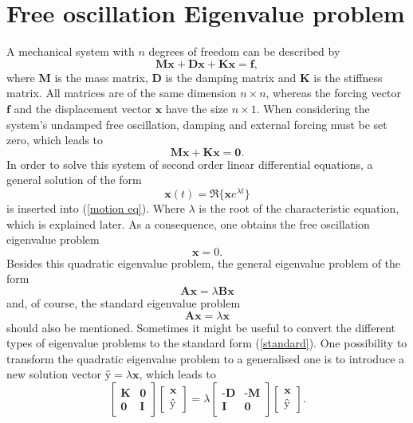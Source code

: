 \documentclass[conference]{journal}
\begin{document}
	\section{Free oscillation Eigenvalue problem}
	A mechanical system with $n$ degrees of freedom can be described by 
	\begin{equation}\label{motion eq}
	\textbf{M\"x}+\textbf{D\.{x}}+\textbf{Kx}=\textbf{f},
	\end{equation}
	where $\mathrm{\textbf{M}}$ is the mass matrix, $\mathrm{\textbf{D}}$ is the damping matrix and $\mathrm{\textbf{K}}$ is the stiffness matrix. All matrices are of the same dimension $n \times n$, whereas the forcing vector $\textbf{f}$ and the displacement vector $\textbf{x}$ have the size $n \times 1$. When considering the system's undamped free oscillation, damping and external forcing must be set zero, which leads to
	\begin{equation}
	\textbf{M\"x}+\textbf{Kx}=\textbf{0}.
	\end{equation}
	In order to solve this system of second order linear differential equations, a general solution of the form
	\begin{equation}
	\textbf{x}(t)=\Re\{\textbf{\^x}e^{\lambda t}\}
	\end{equation}
	is inserted into (\ref{motion eq}). Where $\lambda$ is the root of the characteristic equation, which is explained later. As a consequence, one obtains the free oscillation eigenvalue problem
	\begin{equation}
	[\textbf{K}+\lambda^2 \textbf{M}]\textbf{\^x}=0.
	\end{equation}
	Besides this quadratic eigenvalue problem, the general eigenvalue problem of the form
	\begin{equation}
	\textbf{A\^x}=\lambda\textbf{B\^x}
	\end{equation}
	and, of course, the standard eigenvalue problem
	\begin{equation}\label{standard}
	\textbf{A\^x}=\lambda\textbf{\^x}
	\end{equation}
	should also be mentioned. Sometimes it might be useful to convert the different types of eigenvalue problems to the standard form (\ref{standard}). One possibility to transform the quadratic eigenvalue problem to a generalised one is to introduce a new solution vector $\textbf{\^y}=\lambda\textbf{\^x}$, which leads to
	\begin{equation}
	\begin{bmatrix}
	\textbf{K} & \textbf{0} \\
	\textbf{0} & \textbf{I}
	\end{bmatrix}
	\begin{bmatrix}
	\textbf{\^x} \\
	\textbf{\^y}
	\end{bmatrix}
	=\lambda
	\begin{bmatrix}
	\textbf{-D} & \textbf{-M} \\
	\textbf{I} & \textbf{0}
	\end{bmatrix}
	\begin{bmatrix}
	\textbf{\^x} \\
	\textbf{\^y}
	\end{bmatrix}.
	\end{equation}
\end{document}
